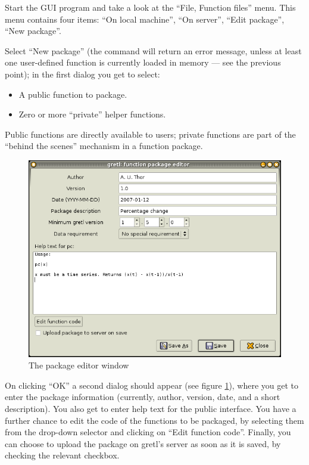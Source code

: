 Start the GUI program and take a look at the ``File, Function files'' menu.
This menu contains four items: ``On local machine'', ``On server'', ``Edit
package'', ``New package''.

Select ``New package'' (the command will return an error message,
unless at least one user-defined function is currently loaded in
memory --- see the previous point); in the first dialog you get to
select:

\begin{itemize}
\item A public function to package.
\item Zero or more ``private'' helper functions.
\end{itemize}

Public functions are directly available to users; private functions are
part of the ``behind the scenes'' mechanism in a function package.

\begin{figure}[htbp]
  \centering
  \includegraphics[scale=0.5]{figures/package_editor}
  \caption{The package editor window}
  \label{fig:package_editor}
\end{figure}

On clicking ``OK'' a second dialog should appear (see figure
\ref{fig:package_editor}), where you get to enter the package
information (currently, author, version, date, and a short
description).  You also get to enter help text for the public
interface.  You have a further chance to edit the code of the
functions to be packaged, by selecting them from the drop-down
selector and clicking on ``Edit function code''. Finally, you can
choose to upload the package on gretl's server as soon as it is saved,
by checking the relevant checkbox.

